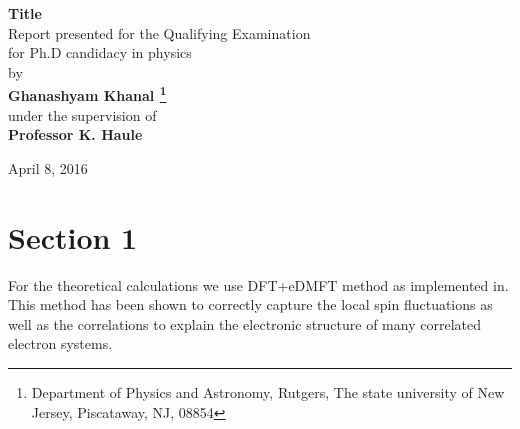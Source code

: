 \documentclass[12pt]{article}
\begin{document}
\begin{titlepage}
    \begin{center}
        \vspace*{1.5cm}

        {\huge{\textbf{Title}}\\
        \vspace{6.0cm}}
        \large{Report presented for the Qualifying Examination\\ for Ph.D candidacy in physics\\ \vspace{0.5cm} by\\ \vspace{0.5cm}
         {\Large{\textbf{Ghanashyam Khanal \footnote{Department of Physics and Astronomy, Rutgers, The state university of New Jersey, Piscataway, NJ, 08854}}}} \\ under the supervision of\\ {\Large{\textbf{Professor K. Haule}}}}

        \vspace{1.5cm}
        April 8, 2016

    \end{center}
\end{titlepage}



\section{Section 1}

For the theoretical calculations we use DFT+eDMFT method as implemented in. This method has been shown to correctly capture the local spin fluctuations as well as the correlations to explain the electronic structure of many correlated electron systems. 



\end{document}
